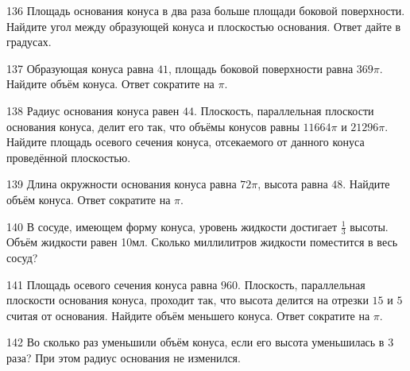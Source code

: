 \documentclass[a4paper]{article}
\begin{document}
\begin{taskBN}{136}
Площадь основания конуса в два раза больше площади боковой поверхности. Найдите угол между образующей конуса и плоскостью основания. Ответ дайте в градусах.
\end{taskBN}

\begin{taskBN}{137}
Образующая конуса равна $41$, площадь боковой поверхности равна $369\pi$. Найдите объём конуса. Ответ сократите на $\pi$.
\end{taskBN}

\begin{taskBN}{138}
Радиус основания конуса равен $44$. Плоскость, параллельная плоскости основания конуса,  делит его так, что объёмы конусов равны $11664\pi$ и $21296\pi$. Найдите площадь осевого сечения конуса, отсекаемого от данного конуса проведённой плоскостью. 
\end{taskBN}

\begin{taskBN}{139}
Длина окружности основания конуса равна $72\pi$, высота равна $48$. Найдите объём конуса. Ответ сократите на $\pi$.
\end{taskBN}

\begin{taskBN}{140}
В сосуде, имеющем форму конуса, уровень жидкости достигает $\frac{1}{3}$ высоты. Объём жидкости равен 10мл. Сколько миллилитров жидкости поместится в весь сосуд?
\end{taskBN}

\begin{taskBN}{141}
Площадь осевого сечения конуса равна $960$. Плоскость, параллельная плоскости основания конуса,  проходит так, что высота делится на отрезки $15$ и $5$ считая от основания. Найдите объём меньшего конуса. Ответ сократите на $\pi$.
\end{taskBN}

\begin{taskBN}{142}
Во сколько раз уменьшили объём конуса, если его высота уменьшилась в 3 раза? При этом радиус основания не изменился.
\end{taskBN}
\end{document}
